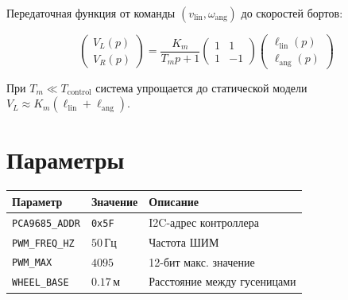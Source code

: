 Передаточная функция от команды $(v_{\text{lin}}, \omega_{\text{ang}})$
до скоростей бортов:

\begin{equation}
  \begin{pmatrix} V_L(p) \\ V_R(p) \end{pmatrix}
  = \frac{K_m}{T_m p + 1}
  \begin{pmatrix} 1 & 1 \\ 1 & -1 \end{pmatrix}
  \begin{pmatrix} \ell_{\text{lin}}(p) \\ \ell_{\text{ang}}(p) \end{pmatrix}
  \label{eq:mixer_motor}
\end{equation}

При $T_m \ll T_{\text{control}}$ система упрощается до
статической модели $V_L \approx K_m(\ell_{\text{lin}} + \ell_{\text{ang}})$.

\section{Параметры}

\begin{center}
\begin{tabular}{lll}
\toprule
\textbf{Параметр} & \textbf{Значение} & \textbf{Описание}\\
\midrule
\texttt{PCA9685\_ADDR} & \texttt{0x5F} & I2C-адрес контроллера\\
\texttt{PWM\_FREQ\_HZ} & $50\,\text{Гц}$ & Частота ШИМ\\
\texttt{PWM\_MAX}       & $4095$ & 12-бит макс. значение\\
\texttt{WHEEL\_BASE}    & $0.17\,\text{м}$ & Расстояние между гусеницами\\
\bottomrule
\end{tabular}
\end{center}
